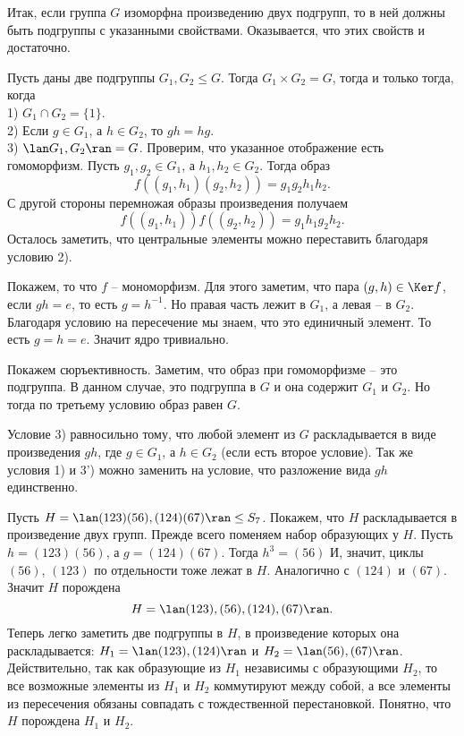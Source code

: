 Итак, если группа $G$ изоморфна произведению двух подгрупп, то в ней должны быть подгруппы с указанными свойствами. Оказывается, что этих свойств и достаточно.

\thrm Пусть даны две подгруппы $G_1,G_2 \leq G$. Тогда $G_1\times G_2=G$, тогда и только тогда, когда\\
1) $G_1\cap G_2 =\{1\}$.\\
2) Если $g\in G_1$, а $h\in G_2$, то $gh=hg$.\\
3) $\lan G_1,G_2\ran = G$.
\ethrm
\proof Проверим, что указанное отображение есть гомоморфизм. Пусть $g_1,g_2 \in G_1$, а $h_1,h_2\in G_2$. Тогда образ $$f((g_1,h_1)(g_2,h_2))=g_1g_2 h_1h_2.$$
С другой стороны перемножая образы произведения получаем 
$$f((g_1,h_1))f((g_2,h_2))=g_1h_1 g_2h_2.$$
Осталось заметить, что центральные элементы можно переставить благодаря условию 2).

Покажем, то что $f$ -- мономорфизм. Для этого заметим, что пара $(g,h)\in \Ker f$, если $gh=e$, то есть $g=h^{-1}$. Но правая часть лежит в $G_1$, а левая -- в $G_2$. Благодаря условию на пересечение мы знаем, что это единичный элемент. То есть $g=h=e$. Значит ядро  тривиально. 

Покажем сюръективность. Заметим, что образ при гомоморфизме  -- это подгруппа. В данном случае, это подгруппа в  $G$ и она содержит $G_1$ и $G_2$. Но тогда по третьему условию образ равен  $G$.
\endproof

\rm Условие 3) равносильно тому, что любой элемент из $G$ раскладывается в виде произведения $gh$, где $g\in G_1$, а $h\in G_2$ (если есть второе условие). Так же условия 1) и 3') можно заменить на условие, что разложение вида $gh$ единственно.  
\erm

\exm \enm
\item Пусть $H=\lan (123) (56), (124)(67)\ran \leq S_7$. Покажем, что $H$ раскладывается в произведение двух групп. Прежде всего поменяем набор образующих у $H$. Пусть $h=(123) (56)$, а $g=(124)(67)$. Тогда $h^3=(56)$ И, значит, циклы $(56)$, $(123)$ по отдельности тоже лежат в $H$. Аналогично
с $(124)$ и $(67)$. Значит $H$ порождена
$$H=\lan (123),(56), (124), (67)\ran.$$
Теперь легко заметить две подгруппы в $H$, в произведение которых она раскладывается: $H_1=\lan (123), (124)\ran$ и $H_2=\lan (56), (67)\ran$. Действительно, так как образующие из $H_1$ независимы с образующими $H_2$, то все возможные элементы из $H_1$ и $H_2$ коммутируют  между собой, а все элементы из пересечения обязаны совпадать с тождественной перестановкой. Понятно, что $H$ порождена $H_1$ и $H_2$.

